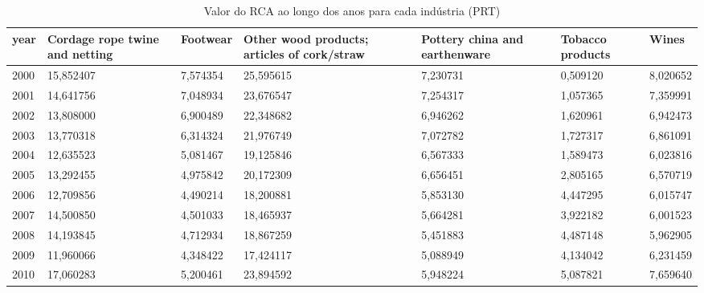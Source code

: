 \begin{table}
\centering
\caption{Valor do RCA ao longo dos anos para cada indústria (PRT)}
\begin{tabular}{p{1cm}p{2cm}p{2cm}p{2cm}p{2cm}p{2cm}p{2cm}}
\toprule
 year &  Cordage rope twine and netting &  Footwear &  Other wood products; articles of cork/straw &  Pottery china and earthenware &  Tobacco products &    Wines \\
\midrule
 2000 &                       15,852407 &  7,574354 &                                    25,595615 &                       7,230731 &          0,509120 & 8,020652 \\
 2001 &                       14,641756 &  7,048934 &                                    23,676547 &                       7,254317 &          1,057365 & 7,359991 \\
 2002 &                       13,808000 &  6,900489 &                                    22,348682 &                       6,946262 &          1,620961 & 6,942473 \\
 2003 &                       13,770318 &  6,314324 &                                    21,976749 &                       7,072782 &          1,727317 & 6,861091 \\
 2004 &                       12,635523 &  5,081467 &                                    19,125846 &                       6,567333 &          1,589473 & 6,023816 \\
 2005 &                       13,292455 &  4,975842 &                                    20,172309 &                       6,656451 &          2,805165 & 6,570719 \\
 2006 &                       12,709856 &  4,490214 &                                    18,200881 &                       5,853130 &          4,447295 & 6,015747 \\
 2007 &                       14,500850 &  4,501033 &                                    18,465937 &                       5,664281 &          3,922182 & 6,001523 \\
 2008 &                       14,193845 &  4,712934 &                                    18,867259 &                       5,451883 &          4,487148 & 5,962905 \\
 2009 &                       11,960066 &  4,348422 &                                    17,424117 &                       5,088949 &          4,134042 & 6,231459 \\
 2010 &                       17,060283 &  5,200461 &                                    23,894592 &                       5,948224 &          5,087821 & 7,659640 \\

\end{tabular}
\end{table}
